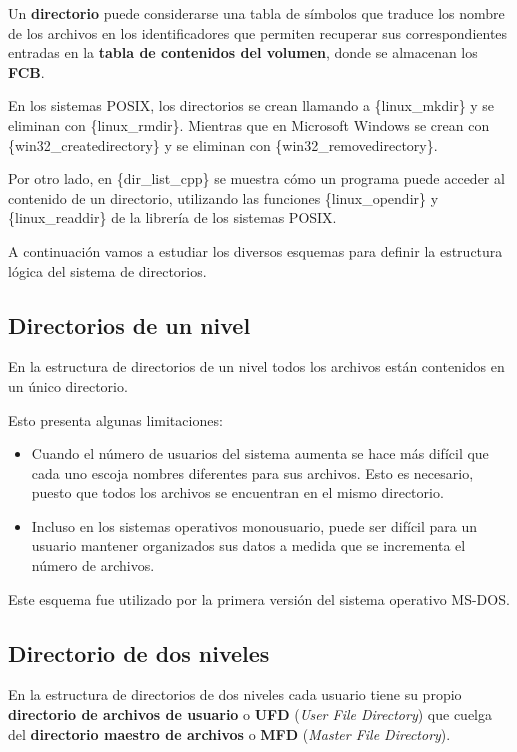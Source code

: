 Un \textbf{{}directorio} puede considerarse una tabla de símbolos que
traduce los nombre de los archivos en los identificadores que permiten
recuperar sus correspondientes entradas en la \textbf{tabla de
contenidos del volumen}, donde se almacenan los \textbf{FCB}.

En los sistemas POSIX, los directorios se crean llamando a
\{linux\_mkdir\} y se eliminan con \{linux\_rmdir\}. Mientras que en
Microsoft Windows se crean con \{win32\_createdirectory\} y se eliminan
con \{win32\_removedirectory\}.

Por otro lado, en \{dir\_list\_cpp\} se muestra cómo un programa puede
acceder al contenido de un directorio, utilizando las funciones
\{linux\_opendir\} y \{linux\_readdir\} de la librería de los sistemas
POSIX.

A continuación vamos a estudiar los diversos esquemas para definir la
estructura lógica del sistema de directorios.

\subsection{Directorios de un nivel}\label{_directorios_de_un_nivel}

En la estructura de directorios de un nivel todos los archivos están
contenidos en un único directorio.

Esto presenta algunas limitaciones:

\begin{itemize}
\item
  Cuando el número de usuarios del sistema aumenta se hace más difícil
  que cada uno escoja nombres diferentes para sus archivos. Esto es
  necesario, puesto que todos los archivos se encuentran en el mismo
  directorio.
\item
  Incluso en los sistemas operativos monousuario, puede ser difícil para
  un usuario mantener organizados sus datos a medida que se incrementa
  el número de archivos.
\end{itemize}

Este esquema fue utilizado por la primera versión del sistema operativo
MS-DOS.

\subsection{Directorio de dos niveles}\label{_directorio_de_dos_niveles}

En la estructura de directorios de dos niveles cada usuario tiene su
propio \textbf{directorio de archivos de usuario}{} o \textbf{{}UFD}
(\emph{User File Directory}) que cuelga del \textbf{directorio maestro
de archivos}{} o \textbf{{}MFD} (\emph{Master File Directory}).

